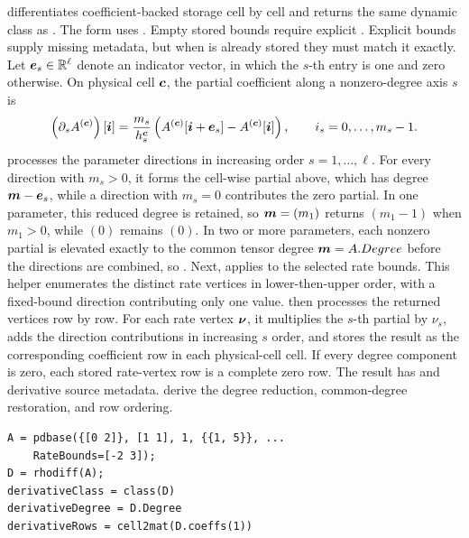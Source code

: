 \arghead
{} differentiates coefficient-backed storage cell by cell and returns the same dynamic class as . The form  uses . Empty stored bounds require explicit . Explicit bounds supply missing metadata, but when  is already stored they must match it exactly. Let $\boldsymbol{e}_s\in\mathbb{R}^{\ell}$ denote an indicator vector, in which the $s$-th entry is one and zero otherwise. On physical cell $\boldsymbol{c}$, the partial coefficient along a nonzero-degree axis $s$ is
\begin{gather*}
    \left(\partial_s A^{(\boldsymbol{c})}\right)[\boldsymbol{i}]
    =\frac{m_s}{h_s^{\boldsymbol{c}}}
    \left(A^{(\boldsymbol{c})}[\boldsymbol{i}+\boldsymbol{e}_s]-A^{(\boldsymbol{c})}[\boldsymbol{i}]\right),
    \qquad i_s=0,\ldots,m_s-1.
\end{gather*}
 processes the parameter directions in increasing order $s=1,\ldots,\ell$. For every direction with $m_s>0$, it forms the cell-wise partial above, which has degree $\boldsymbol{m}-\boldsymbol{e}_s$, while a direction with $m_s=0$ contributes the zero partial. In one parameter, this reduced degree is retained, so $\boldsymbol{m}=(m_1)$ returns $(m_1-1)$ when $m_1>0$, while $(0)$ remains $(0)$. In two or more parameters, each nonzero partial is elevated exactly to the common tensor degree $\boldsymbol{m}=A.Degree$ before the directions are combined, so . Next,  applies  to the selected rate bounds. This helper enumerates the distinct rate vertices in lower-then-upper  order, with a fixed-bound direction contributing only one value.  then processes the returned vertices row by row. For each rate vertex $\boldsymbol{\nu}$, it multiplies the $s$-th partial by $\nu_s$, adds the direction contributions in increasing $s$ order, and stores the result as the corresponding coefficient row in each physical-cell cell. If every degree component is zero, each stored rate-vertex row is a complete zero row. The result has  and derivative source metadata.  derive the degree reduction, common-degree restoration, and row ordering.

\examplehead
\begin{lstlisting}[style=dpmatlab]
A = pdbase({[0 2]}, [1 1], 1, {{1, 5}}, ...
    RateBounds=[-2 3]);
D = rhodiff(A);
derivativeClass = class(D)
derivativeDegree = D.Degree
derivativeRows = cell2mat(D.coeffs(1))
\end{lstlisting}

